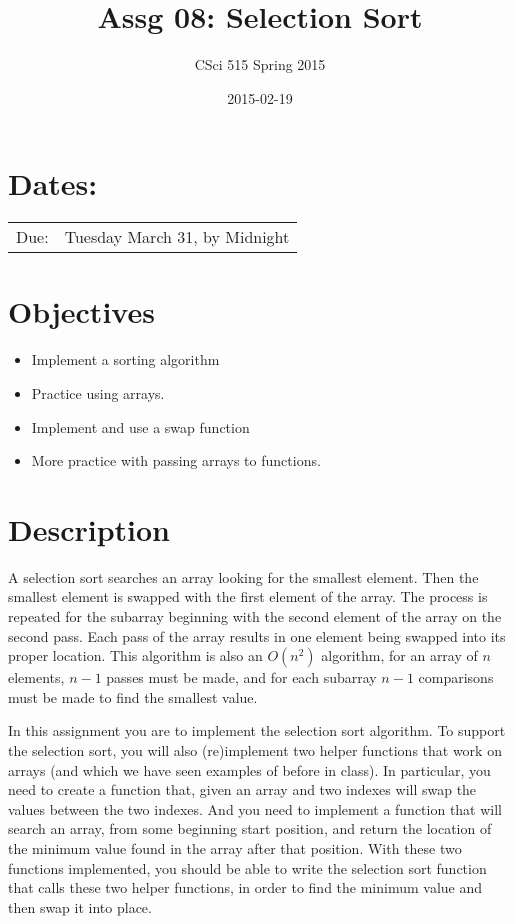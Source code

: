 \documentclass[11pt]{article}
\title{Assg 08: Selection Sort}
\author{CSci 515 Spring 2015}
\date{2015-02-19}
\begin{document}
\maketitle


\section*{Dates:}
\label{sec-1}


\begin{center}
\begin{tabular}{ll}
 Due:  &  Tuesday March 31, by Midnight  \\
\end{tabular}
\end{center}
\section*{Objectives}
\label{sec-2}

\begin{itemize}
\item Implement a sorting algorithm
\item Practice using arrays.
\item Implement and use a swap function
\item More practice with passing arrays to functions.
\end{itemize}
\section*{Description}
\label{sec-3}

A selection sort searches an array looking for the smallest element.
Then the smallest element is swapped with the first element of the
array.  The process is repeated for the subarray beginning with the
second element of the array on the second pass.  Each pass of the
array results in one element being swapped into its proper location.
This algorithm is also an $O(n^2)$ algorithm, for an array of $n$
elements, $n - 1$ passes must be made, and for each subarray $n - 1$
comparisons must be made to find the smallest value.

In this assignment you are to implement the selection sort algorithm.
To support the selection sort, you will also (re)implement two helper
functions that work on arrays (and which we have seen examples of
before in class).  In particular, you need to create a function that,
given an array and two indexes will swap the values between the two
indexes.  And you need to implement a function that will search an
array, from some beginning start position, and return the location of
the minimum value found in the array after that position.  With these
two functions implemented, you should be able to write the selection
sort function that calls these two helper functions, in order to find
the minimum value and then swap it into place.
\end{document}
